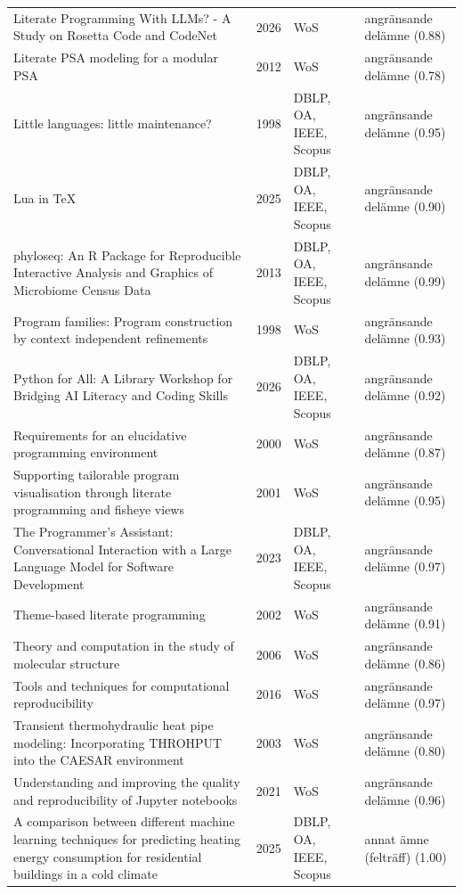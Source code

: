 \begin{longtable}{@{}%
  >{\raggedright\arraybackslash}p{}c%
  >{\raggedright\arraybackslash}p{}%
  >{\raggedright\arraybackslash}p{}@{}}
Literate Programming With LLMs? - A Study on Rosetta Code and CodeNet & 2026 & WoS & angränsande delämne (0.88) \\
Literate PSA modeling for a modular PSA & 2012 & WoS & angränsande delämne (0.78) \\
Little languages: little maintenance? & 1998 & DBLP, OA, IEEE, Scopus & angränsande delämne (0.95) \\
Lua in TeX & 2025 & DBLP, OA, IEEE, Scopus & angränsande delämne (0.90) \\
phyloseq: An R Package for Reproducible Interactive Analysis and Graphics of Microbiome Census Data & 2013 & DBLP, OA, IEEE, Scopus & angränsande delämne (0.99) \\
Program families: Program construction by context independent refinements & 1998 & WoS & angränsande delämne (0.93) \\
Python for All: A Library Workshop for Bridging AI Literacy and Coding Skills & 2026 & DBLP, OA, IEEE, Scopus & angränsande delämne (0.92) \\
Requirements for an elucidative programming environment & 2000 & WoS & angränsande delämne (0.87) \\
Supporting tailorable program visualisation through literate programming and fisheye views & 2001 & WoS & angränsande delämne (0.95) \\
The Programmer's Assistant: Conversational Interaction with a Large Language Model for Software Development & 2023 & DBLP, OA, IEEE, Scopus & angränsande delämne (0.97) \\
Theme-based literate programming & 2002 & WoS & angränsande delämne (0.91) \\
Theory and computation in the study of molecular structure & 2006 & WoS & angränsande delämne (0.86) \\
Tools and techniques for computational reproducibility & 2016 & WoS & angränsande delämne (0.97) \\
Transient thermohydraulic heat pipe modeling: Incorporating THROHPUT into the CAESAR environment & 2003 & WoS & angränsande delämne (0.80) \\
Understanding and improving the quality and reproducibility of Jupyter notebooks & 2021 & WoS & angränsande delämne (0.96) \\
A comparison between different machine learning techniques for predicting heating energy consumption for residential buildings in a cold climate & 2025 & DBLP, OA, IEEE, Scopus & annat ämne (felträff) (1.00) \\

\end{longtable}
